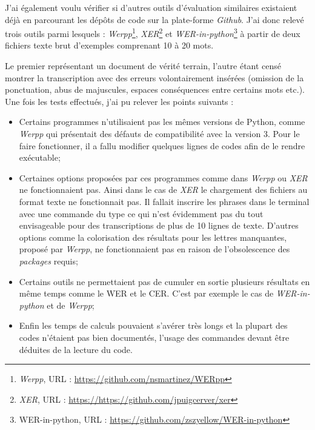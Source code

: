 J'ai également voulu vérifier si d'autres outils d'évaluation similaires existaient déjà en parcourant les dépôts de code sur la plate-forme \textit{Github}. J'ai donc relevé trois outils parmi lesquels :  \textit{Werpp}\footnote{\textit{Werpp}, URL : \url{https://github.com/nsmartinez/WERpp}}, \textit{XER}\footnote{\textit{XER}, URL : \url{https://https://github.com/jpuigcerver/xer}} et \textit{WER-in-python}\footnote{WER-in-python, URL : \url{https://github.com/zszyellow/WER-in-python}} à partir de deux fichiers texte brut d'exemples comprenant 10 à 20 mots. 

Le premier représentant un document de vérité terrain, l'autre étant censé montrer la transcription avec des erreurs volontairement insérées (omission de la ponctuation, abus de majuscules, espaces conséquences entre certains mots etc.).\\
\newpage
Une fois les tests effectués, j'ai pu relever les points suivants :
\begin{itemize}
    \item Certains programmes n'utilisaient pas les mêmes versions de Python, comme \textit{Werpp} qui présentait des défauts de compatibilité avec la version 3. Pour le faire fonctionner, il a fallu modifier quelques lignes de codes afin de le rendre exécutable;
    \item Certaines options proposées par ces programmes comme dans \textit{Werpp} ou \textit{XER} ne fonctionnaient pas. Ainsi dans le cas de \textit{XER} le chargement des fichiers au format texte ne fonctionnait pas. Il fallait inscrire les phrases dans le terminal avec une commande du type  ce qui n'est évidemment pas du tout envisageable pour des transcriptions de plus de 10 lignes de texte. D'autres options comme la colorisation des résultats pour les lettres manquantes, proposé par \textit{Werpp}, ne fonctionnaient pas en raison de l'obsolescence des \textit{packages} requis;
    \item Certains outils ne permettaient pas de cumuler en sortie plusieurs résultats en même temps comme le WER et le CER. C'est par exemple le cas de \textit{WER-in-python} et de \textit{Werpp};
    \item Enfin les temps de calculs pouvaient s'avérer très longs et la plupart des codes n'étaient pas bien documentés, l'usage des commandes devant être déduites de la lecture du code.\\
\end{itemize}
\medskip

